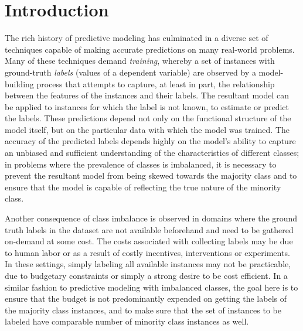 \section{Introduction}
\label{sec:intro}

The rich history of predictive modeling has culminated in a diverse set of techniques capable of making accurate predictions on many real-world problems. Many of these techniques demand \emph{training}, whereby a set of instances with ground-truth \emph{labels} (values of a dependent variable) are observed by a model-building process that attempts to capture, at least in part, the relationship between the features of the instances and their labels.  The resultant model can be applied to instances for which the label is not known, to estimate or predict the labels.  These predictions depend not only on the functional structure of the model itself, but on the particular data with which the model was trained.  The accuracy of the predicted labels depends highly on the model's ability to capture an unbiased and sufficient understanding of the characteristics of different classes; in problems where the prevalence of classes is imbalanced, it is necessary to prevent the resultant model from being skewed towards the majority class and to ensure that the model is capable of reflecting the true nature of the minority class.

Another consequence of class imbalance is observed in domains where the ground truth labels in the dataset are not available beforehand and need to be gathered on-demand at some cost.  The costs associated with collecting labels may be due to human labor or as a result of costly incentives, interventions or experiments.  In these settings, simply labeling all available instances may not be practicable, due to budgetary constraints or simply a strong desire to be cost efficient. In a similar fashion to predictive modeling with imbalanced classes, the goal here is to ensure that the budget is not predominantly expended on getting the labels of the majority class instances, and to make sure that the set of instances to be labeled have comparable number of minority class instances as well.

